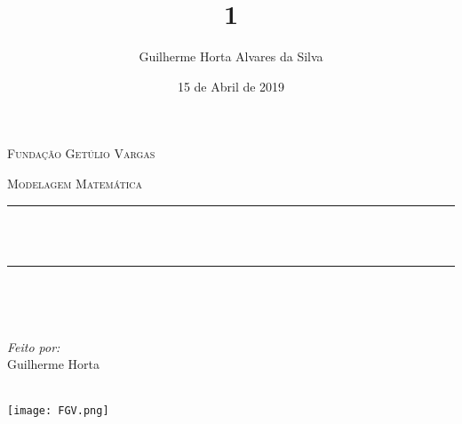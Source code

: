 \documentclass[12pt]{report}
\title{1}
\author{Guilherme Horta Alvares da Silva}
\date{15 de Abril de 2019}
\makeatletter
\let\thetitle\@title
\makeatother
\begin{document}

\begin{titlepage}
	\centering
    \vspace*{0.5 cm}
   \begin{center}    \textsc{\Large   Fundação Getúlio Vargas}\\[2.0 cm]	\end{center}%
   \textsc{\Large Modelagem Matemática  }\\[0.5 cm]				%
	\rule{\linewidth}{0.2 mm} \\[0.4 cm]
	{ \huge \bfseries \thetitle}\\
	\rule{\linewidth}{0.2 mm} \\[1.5 cm]
	
	\begin{minipage}{0.4\textwidth}
		\begin{flushleft} \large
			\end{flushleft}
			\end{minipage}~
			\begin{minipage}{0.4\textwidth}
            
			\begin{flushright} \large
        \emph{Feito por:} \\
      Guilherme Horta 
		\end{flushright}
           
	\end{minipage}\\[2 cm]
	
  \texttt{[image: FGV.png]}
    
    
    
    
	
\end{titlepage}


\tableofcontents
\pagebreak

\renewcommand{\thesection}{\arabic{section}}
\end{document}
